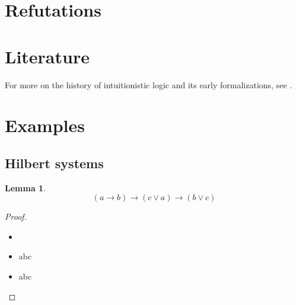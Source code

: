 \documentclass[]{article}
\newcommand{\Or}{\vee}
\newcommand{\Imp}{\rightarrow}
\newtheorem{lemma}[theorem]{Lemma}
\begin{document}
\section{Refutations}
\label{sec:refutations}


\section{Literature}
\label{sec:literature}

For more on the history of intuitionistic logic and its early
formalizations, see
\cite{
  Kleene.1952.Metamathematics,
  Troelstra.2000.ProofTheory,
  SEP.2013.DevelopmentOfIntuitionisticLogic}.

\section{Examples}
\label{sec:examples}

\subsection{Hilbert systems}
\label{sec:ex-hilbert}

\begin{lemma}
\label{lem:hilbert}
  \[
  (a \Imp b) \Imp (c \Or a) \Imp (b \Or c)
  \]
\end{lemma}

\begin{proof}

\begin{itemize}
\item[]
\item[1.] abc
\item[2.] abc
\end{itemize}

\end{proof}




\end{document}

